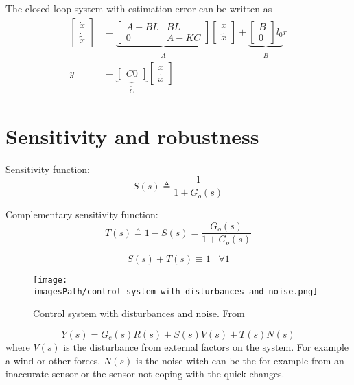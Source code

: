 The closed-loop system with estimation error can be written as 
\begin{align*}
   \begin{bmatrix} \dot{x} \\ \dot{\tilde{x}} \end{bmatrix} &= 
   \underbrace{\begin{bmatrix} A-BL & BL \\ 0 & A-KC \end{bmatrix}}_{\tilde{A}}
   \begin{bmatrix} x \\ \tilde{x} \end{bmatrix} 
   +\underbrace{\begin{bmatrix} B \\ 0 \end{bmatrix}l_0}_{\tilde{B}}r \\
    y &= \underbrace{\begin{bmatrix} C 0 \end{bmatrix}}_{\tilde{C}}
    \begin{bmatrix} x \\ \tilde{x} \end{bmatrix}
\end{align*}

\section{Sensitivity and robustness}
Sensitivity function:
\begin{equation*}
    S(s) \triangleq \frac{1}{1+G_o(s)}
\end{equation*}

Complementary sensitivity function:
\begin{equation*}
    T(s) \triangleq 1-S(s) = \frac{G_o(s)}{1+ G_o(s)}
\end{equation*}

\begin{equation}\label{eq:s_and_t}
    S(s) + T(s) \equiv 1 \;\;\; \forall 1
\end{equation}

\begin{figure}[!h]
    \centering
    \texttt{[image: \\imagesPath/control\_system\_with\_disturbances\_and\_noise.png]}
    \caption{Control system with disturbances and noise. From \cite{}}
\end{figure}

\begin{equation*}
    Y(s) = G_c(s)R(s) + S(s)V(s) + T(s)N(s)
\end{equation*}
where $V(s)$ is the disturbance from external factors on the system. For example a wind 
or other forces. $N(s)$ is the noise witch can be the for example from an inaccurate sensor 
or the sensor not coping with the quick changes.

